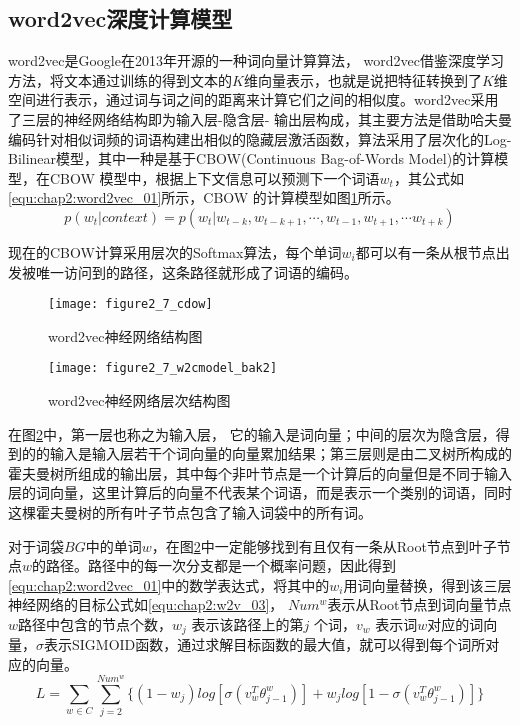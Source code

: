 \subsection{word2vec深度计算模型}
word2vec是Google在2013年开源的一种词向量计算算法， word2vec借鉴深度学习方法，将文本通过训练的得到文本的$K$维向量表示，也就是说把特征转换到了$K$维空间进行表示，通过词与词之间的距离来计算它们之间的相似度。word2vec采用了三层的神经网络结构即为输入层-隐含层- 输出层构成，其主要方法是借助哈夫曼编码针对相似词频的词语构建出相似的隐藏层激活函数，算法采用了层次化的Log-Bilinear模型，其中一种是基于CBOW(Continuous Bag-of-Words Model)的计算模型，在CBOW 模型中，根据上下文信息可以预测下一个词语$w_{t}$，其公式如\ref{equ:chap2:word2vec_01}所示，CBOW 的计算模型如图\ref{fig:2_7_cdow}所示。
\begin{equation}
\label{equ:chap2:word2vec_01}
p(w_{t}|context)=p(w_{t}|w_{t-k},w_{t-k+1},\cdots ,w_{t-1},w_{t+1},\cdots w_{t+k})
\end{equation}
\par 现在的CBOW计算采用层次的Softmax算法，每个单词$w_{i}$都可以有一条从根节点出发被唯一访问到的路径，这条路径就形成了词语的编码。
\begin{figure}[htp]
\centering
\texttt{[image: figure2\_7\_cdow]}
\caption{word2vec神经网络结构图}
\label{fig:2_7_cdow}
\end{figure}
\begin{figure}[htp]
\centering
\texttt{[image: figure2\_7\_w2cmodel\_bak2]}
\caption{word2vec神经网络层次结构图}
\label{fig:2_7}
\end{figure}
\par 在图\ref{fig:2_7}中，第一层也称之为输入层， 它的输入是词向量；中间的层次为隐含层，得到的的输入是输入层若干个词向量的向量累加结果；第三层则是由二叉树所构成的霍夫曼树所组成的输出层，其中每个非叶节点是一个计算后的向量但是不同于输入层的词向量，这里计算后的向量不代表某个词语，而是表示一个类别的词语，同时这棵霍夫曼树的所有叶子节点包含了输入词袋中的所有词。
\par 对于词袋$BG$中的单词$w$，在图\ref{fig:2_7}中一定能够找到有且仅有一条从Root节点到叶子节点$w$的路径。路径中的每一次分支都是一个概率问题，因此得到\ref{equ:chap2:word2vec_01}中的数学表达式，将其中的$w_{i}$用词向量替换，得到该三层神经网络的目标公式如\ref{equ:chap2:w2v_03}， $Num^{w}$表示从Root节点到词向量节点$w$路径中包含的节点个数，$w_{j}$ 表示该路径上的第$j$ 个词，$v_{w}$ 表示词$w$对应的词向量，$\sigma$表示SIGMOID函数，通过求解目标函数的最大值，就可以得到每个词所对应的向量。
\begin{equation}
\label{equ:chap2:w2v_03}
L=\sum_{w\in C}\sum_{j=2}^{Num^{w}}\{(1-w_{j})log[\sigma(v_{w}^{T}\theta_{j-1}^{w})]+w_{j}log[1-\sigma(v_{w}^{T}\theta_{j-1}^{w})]\}
\end{equation}
